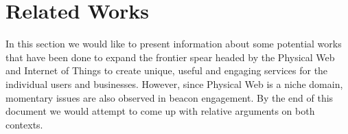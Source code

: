 \section{Related Works}

In this section we would like to present information about some potential works that have been done to expand the frontier spear headed by the Physical Web and Internet of Things to create unique, useful and engaging services for the individual users and businesses. However, since Physical Web is a niche domain, momentary issues are also observed in beacon engagement. By the end of this document we would attempt to come up with relative arguments on both contexts.





